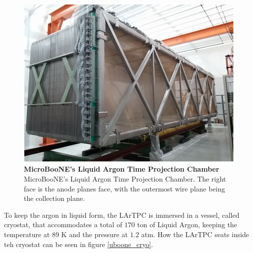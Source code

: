\begin{figure}[h!]
	\begin{center}
		\includegraphics[scale=0.6]{Figures/uboone_LArTPC.png}
		\caption[MicroBooNE's Liquid Argon Time Projection Chamber]{{\textbf{MicroBooNE's Liquid Argon Time Projection Chamber}} \\MicroBooNE's Liquid Argon Time Projection Chamber. The right face is the anode planes face, with the outermost wire plane being the collection plane. \cite{microboone_design}}
		\label{uboone_lartpc}	
	\end{center}
\end{figure}

To keep the argon in liquid form, the LArTPC is immersed in a vessel, called cryostat, that accommodates a total of $170$ ton of Liquid Argon, keeping the temperature at $89$ K and the pressure at $1.2$ atm. How the LArTPC seats inside teh cryostat can be seen in figure \ref{uboone_cryo}.

